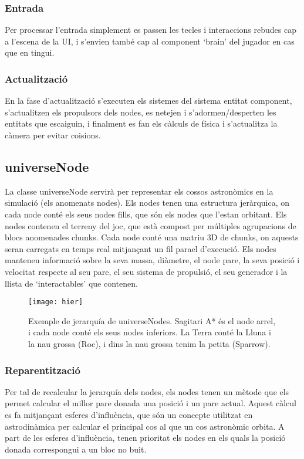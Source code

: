 \subsubsection{Entrada}
Per processar l'entrada simplement es passen les tecles i interaccions rebudes cap a l'escena de la UI, i s'envien també cap al component `brain' del jugador en cas que en tingui.
\subsubsection{Actualització}
En la fase d'actualització s'executen els sistemes del sistema entitat component, s'actualitzen els propulsors dels nodes, es netejen i s'adormen/desperten les entitats que escaiguin, i finalment es fan els càlculs de física i s'actualitza la càmera per evitar co\lgem isions.
\subsection{universeNode}
La classe universeNode servirà per representar els cossos astronòmics en la simulació (els anomenats nodes). Els nodes tenen una estructura jeràrquica, on cada node conté els seus nodes fills, que són els nodes que l'estan orbitant.
Els nodes contenen el terreny del joc, que està compost per múltiples agrupacions de blocs anomenades chunks. 
Cada node conté una matriu 3D de chunks, on aquests seran carregats en temps real mitjançant un fil para\lgem el d'execució.
Els nodes mantenen informació sobre la seva massa, diàmetre, el node pare, la seva posició i velocitat respecte al seu pare, el seu sistema de propulsió, el seu generador i la llista de `interactables' que contenen.
\begin{figure}[H]
  \centering
  \texttt{[image: hier]}
  \caption{Exemple de jerarquía de universeNodes. Sagitari A* és el node arrel, i cada node conté els seus nodes inferiors. La Terra conté la Lluna i la nau grossa (Roc), i dins la nau grossa tenim la petita (Sparrow).}
\end{figure}
\subsubsection{Reparentització}
Per tal de recalcular la jerarquía dels nodes, els nodes tenen un mètode que els permet calcular el millor pare donada una posició i un pare actual. Aquest càlcul es fa mitjançant esferes d'influència, que són un concepte utilitzat en astrodinàmica per calcular el principal cos al que un cos astronòmic orbita. A part de les esferes d'influència, tenen prioritat els nodes en els quals la posició donada correspongui a un bloc no buit.
